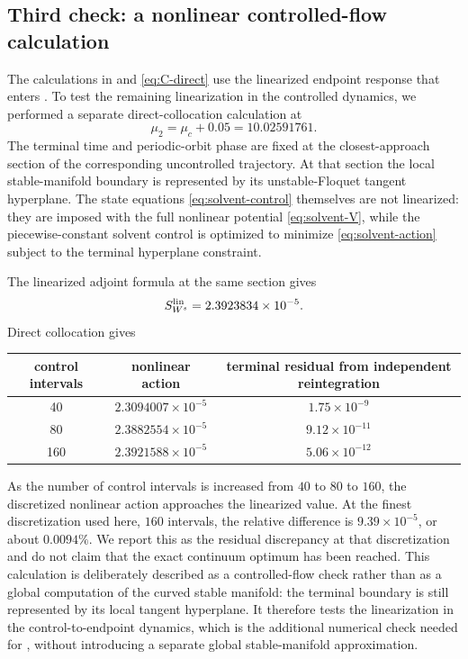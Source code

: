 \documentclass[11pt]{article}
\theoremstyle{definition}
\theoremstyle{remark}
\begin{document}
\subsection{Third check: a nonlinear controlled-flow calculation}

The calculations in  and \eqref{eq:C-direct} use the linearized endpoint response that enters .  To test the remaining linearization in the controlled dynamics, we performed a separate direct-collocation calculation at
\begin{equation}
\mu_2=\mu_c+0.05=10.02591761.
\end{equation}
The terminal time and periodic-orbit phase are fixed at the closest-approach section of the corresponding uncontrolled trajectory.  At that section the local stable-manifold boundary is represented by its unstable-Floquet tangent hyperplane.  The state equations \eqref{eq:solvent-control} themselves are not linearized: they are imposed with the full nonlinear potential \eqref{eq:solvent-V}, while the piecewise-constant solvent control is optimized to minimize \eqref{eq:solvent-action} subject to the terminal hyperplane constraint.

The linearized adjoint formula at the same section gives
\begin{equation}
S_{W^s}^{\rm lin}=2.3923834\times10^{-5}.
\end{equation}
Direct collocation gives
\begin{center}
\begin{tabular}{ccc}
\toprule
control intervals & nonlinear action & terminal residual from independent reintegration\\
\midrule
40  & $2.3094007\times10^{-5}$ & $1.75\times10^{-9}$\\
80  & $2.3882554\times10^{-5}$ & $9.12\times10^{-11}$\\
160 & $2.3921588\times10^{-5}$ & $5.06\times10^{-12}$\\
\bottomrule
\end{tabular}
\end{center}
As the number of control intervals is increased from $40$ to $80$ to $160$, the discretized nonlinear action approaches the linearized value.  At the finest discretization used here, $160$ intervals, the relative difference is $9.39\times10^{-5}$, or about $0.0094\%$.  We report this as the residual discrepancy at that discretization and do not claim that the exact continuum optimum has been reached.  This calculation is deliberately described as a controlled-flow check rather than as a global computation of the curved stable manifold: the terminal boundary is still represented by its local tangent hyperplane.  It therefore tests the linearization in the control-to-endpoint dynamics, which is the additional numerical check needed for , without introducing a separate global stable-manifold approximation.
\end{document}
